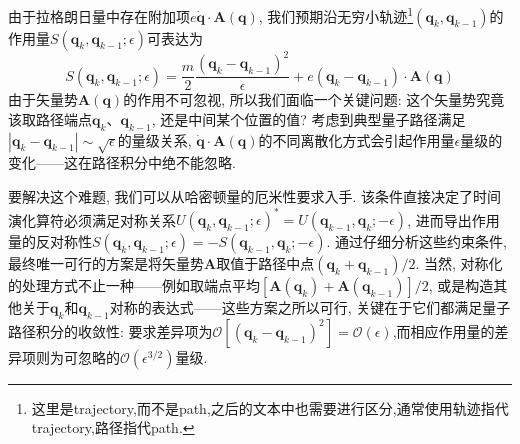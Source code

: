 由于拉格朗日量中存在附加项$e\dot{\mathbf{q}} \cdot \mathbf{A}(\mathbf{q})$, 我们预期沿无穷小轨迹\footnote{这里是trajectory,而不是path,之后的文本中也需要进行区分,通常使用轨迹指代trajectory,路径指代path.}$(\mathbf{q}_k, \mathbf{q}_{k-1})$的作用量$S(\mathbf{q}_k, \mathbf{q}_{k-1}; \epsilon)$可表达为
\begin{equation}\label{56}
	S(\mathbf{q}_k,\mathbf{q}_{k-1};\epsilon)=\frac{m}{2}\frac{(\mathbf{q}_k-\mathbf{q}_{k-1})^2}{\epsilon}+e(\mathbf{q}_k-\mathbf{q}_{k-1})\cdot\mathbf{A}(\mathbf{q})
\end{equation}
由于矢量势$\mathbf{A}(\mathbf{q})$的作用不可忽视, 所以我们面临一个关键问题: 这个矢量势究竟该取路径端点$\mathbf{q}_k$、$\mathbf{q}_{k-1}$, 还是中间某个位置的值? 考虑到典型量子路径满足$|\mathbf{q}_k - \mathbf{q}_{k-1}| \sim \sqrt{\epsilon}$的量级关系, $\dot{\mathbf{q}} \cdot \mathbf{A}(\mathbf{q})$的不同离散化方式会引起作用量$\epsilon$量级的变化——这在路径积分中绝不能忽略.

要解决这个难题, 我们可以从哈密顿量的厄米性要求入手. 该条件直接决定了时间演化算符必须满足对称关系$U(\mathbf{q}_k, \mathbf{q}_{k-1}; \epsilon)^* = U(\mathbf{q}_{k-1}, \mathbf{q}_k; -\epsilon)$, 进而导出作用量的反对称性$S(\mathbf{q}_k, \mathbf{q}_{k-1}; \epsilon) = -S(\mathbf{q}_{k-1}, \mathbf{q}_k; -\epsilon)$. 通过仔细分析这些约束条件, 最终唯一可行的方案是将矢量势$\mathbf{A}$取值于路径中点$(\mathbf{q}_k + \mathbf{q}_{k-1})/2$. 当然, 对称化的处理方式不止一种——例如取端点平均$[\mathbf{A}(\mathbf{q}_k) + \mathbf{A}(\mathbf{q}_{k-1})]/2$, 或是构造其他关于$\mathbf{q}_k$和$\mathbf{q}_{k-1}$对称的表达式——这些方案之所以可行, 关键在于它们都满足量子路径积分的收敛性:
要求差异项为$\mathcal{O}[(\mathbf{q}_k - \mathbf{q}_{k-1})^2] = \mathcal{O}(\epsilon)$,而相应作用量的差异项则为可忽略的$\mathcal{O}(\epsilon^{3/2})$量级.

